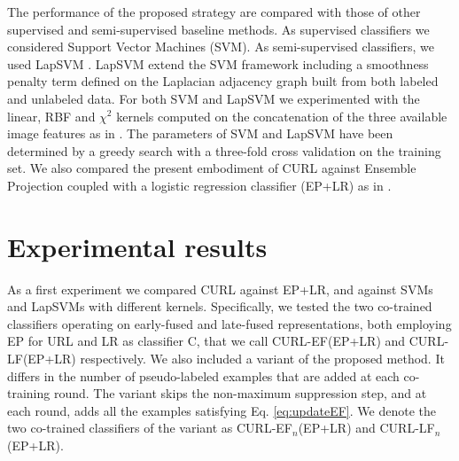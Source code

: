 \documentclass[journal,11pt]{IEEEtran}
\newcommand{\ADD}[1]{#1}
\newcommand{\coso}{strategy}
\newcommand{\emb}{embodiment}
\newcommand{\curlef}{CURL-EF(EP+LR)}
\newcommand{\curllf}{CURL-LF(EP+LR)}
\newcommand{\curlefn}{CURL-EF$_n$(EP+LR)}
\newcommand{\curllfn}{CURL-LF$_n$(EP+LR)}
\begin{document}
The performance of the proposed \coso{ } are compared with those of
other supervised and semi-supervised \ADD{baseline} methods. As supervised
classifiers we considered Support Vector Machines (SVM).  As
semi-supervised classifiers, we used LapSVM
\cite{sindhwani2005beyond,belkin2006manifold}. LapSVM extend the SVM
framework including a smoothness penalty term defined on the
Laplacian adjacency graph built from both labeled and unlabeled data.
For both SVM and LapSVM we experimented with the linear, RBF and
$\chi^2$ kernels computed on the concatenation of the three available
image features as in \cite{dai2013ensemble}.  The parameters of SVM and LapSVM have been determined by
a greedy search with a three-fold cross validation on the training
set. We also compared \ADD{the present \emb{ } of CURL against} Ensemble Projection coupled with a logistic regression classifier (EP+LR) as in \cite{dai2013ensemble}. %

\section{Experimental results}\label{sec:results}
As a first experiment we compared CURL against EP+LR, and against
SVMs and LapSVMs with different kernels. Specifically, we tested the two co-trained classifiers operating on early-fused and late-fused representations, both employing EP for URL and LR as classifier C, that we call \curlef{ } and \curllf{ } respectively.
We also included a variant of the proposed method. It differs in the number of pseudo-labeled examples that are added at each co-training round. The variant skips the non-maximum suppression step, and at each round, adds all the examples satisfying Eq. \ref{eq:updateEF}. We denote the two co-trained classifiers of the variant as \curlefn{ } and \curllfn.
\end{document}
